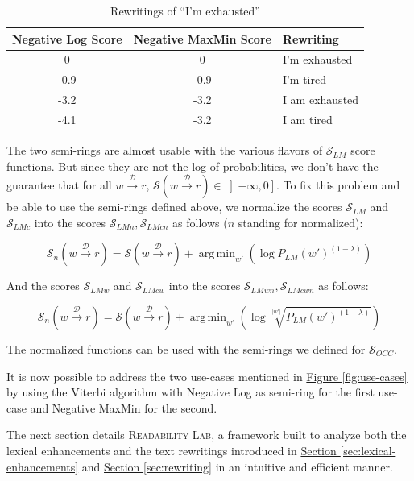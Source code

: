 \documentclass[a4paper, 11pt, onepage]{scrreprt}
\newcommand\figureref[1]{\hyperref[#1]{Figure \ref*{#1}}}
\newcommand\sectionref[1]{\hyperref[#1]{Section \ref*{#1}}}
\newcommand\maps[1]{\xrightarrow{\mathcal{#1}}}
\newcommand\card[1]{\lvert #1 \rvert}
\newcommand\proba[2][]{P_{#1} \left( #2 \right)}
\DeclareMathOperator*{\argmin}{\arg\,\min}
\begin{document}
\begin{table}[H]
  \centering
  \caption{Rewritings of “I'm exhausted”}
  \begin{tabular}[H]{SSl}
    \toprule
    {Negative Log Score} & {Negative MaxMin Score} & {Rewriting} \\
     & 0 & I'm exhausted \\
    -0.9 & -0.9 & I'm tired \\
    -3.2 & -3.2 & I am exhausted \\
    -4.1 & -3.2 & I am tired \\
  \end{tabular}
  \label{tab:neglog}
\end{table}

The two semi-rings are almost usable with the various flavors of
$\mathcal{S}_{LM}$ score functions. But since they are not the log of
probabilities, we don't have the guarantee that for all $w \maps{D}
r$, $\mathcal{S} \left( w \maps{D} r \right) \in \left]-\infty,
  0\right]$. To fix this problem and be able to use the semi-rings
defined above, we normalize the scores $\mathcal{S}_{LM}$ and
$\mathcal{S}_{LMc}$ into the scores $\mathcal{S}_{LMn},
\mathcal{S}_{LMcn}$ as follows ($n$ standing for normalized):

\[
\mathcal{S}_{n} \left( w \maps{D} r \right) = \mathcal{S} \left( w
  \maps{D} r \right) + \argmin_{w'} \left( \log \proba[LM]{w'}^{(1 - \lambda)} \right)
\]

And the scores $\mathcal{S}_{LMw}$ and $\mathcal{S}_{LMcw}$ into the
scores $\mathcal{S}_{LMwn}, \mathcal{S}_{LMcwn}$ as follows:

\[
\mathcal{S}_{n} \left( w \maps{D} r \right) = \mathcal{S} \left( w
  \maps{D} r \right) + \argmin_{w'} \left( \log
  \sqrt[\card{w'}]{\proba[LM]{w'}^{(1 - \lambda)}} \right)
\]

The normalized functions can be used with the semi-rings we defined
for $\mathcal{S}_{OCC}$.

It is now possible to address the two use-cases mentioned in
\figureref{fig:use-cases} by using the Viterbi algorithm
\cite{forney1973viterbi} with Negative Log as semi-ring for the first
use-case and Negative MaxMin for the second.

The next section details \textsc{Readability Lab}, a framework built
to analyze both the lexical enhancements and the text rewritings
introduced in \sectionref{sec:lexical-enhancements}
and \sectionref{sec:rewriting}
in an intuitive and efficient manner.
\end{document}
